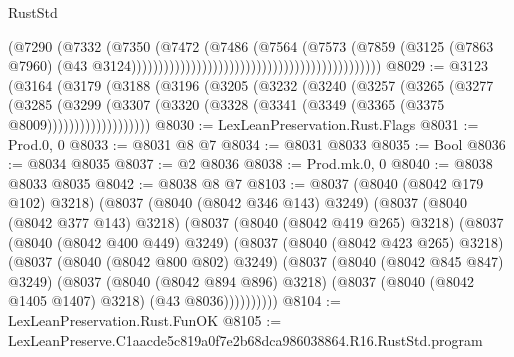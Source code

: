 \begin{lexlean}{RustStd}
\begin{coremodule}
                                                                            (@7290
                                                                              (@7332
                                                                                (@7350
                                                                                  (@7472
                                                                                    (@7486
                                                                                      (@7564
                                                                                        (@7573
                                                                                          (@7859
                                                                                            (@3125
                                                                                              (@7863
                                                                                                @7960)
                                                                                              (@43
                                                                                                @3124))))))))))))))))))))))))))))))))))))))))))))))
@8029 := @3123
    (@3164
      (@3179
        (@3188
          (@3196
            (@3205
              (@3232
                (@3240
                  (@3257
                    (@3265
                      (@3277
                        (@3285
                          (@3299
                            (@3307
                              (@3320 (@3328 (@3341 (@3349 (@3365 (@3375 @8009)))))))))))))))))))
@8030 := LexLeanPreservation.Rust.Flags
@8031 := Prod.{0, 0}
@8033 := @8031 @8 @7
@8034 := @8031 @8033
@8035 := Bool
@8036 := @8034 @8035
@8037 := @2 @8036
@8038 := Prod.mk.{0, 0}
@8040 := @8038 @8033 @8035
@8042 := @8038 @8 @7
@8103 := @8037
    (@8040 (@8042 @179 @102) @3218)
    (@8037
      (@8040 (@8042 @346 @143) @3249)
      (@8037
        (@8040 (@8042 @377 @143) @3218)
        (@8037
          (@8040 (@8042 @419 @265) @3218)
          (@8037
            (@8040 (@8042 @400 @449) @3249)
            (@8037
              (@8040 (@8042 @423 @265) @3218)
              (@8037
                (@8040 (@8042 @800 @802) @3249)
                (@8037
                  (@8040 (@8042 @845 @847) @3249)
                  (@8037
                    (@8040 (@8042 @894 @896) @3218)
                    (@8037 (@8040 (@8042 @1405 @1407) @3218) (@43 @8036))))))))))
@8104 := LexLeanPreservation.Rust.FunOK
@8105 := LexLeanPreserve.C1aacde5c819a0f7e2b68dca986038864.R16.RustStd.program

\end{coremodule}
\end{lexlean}
